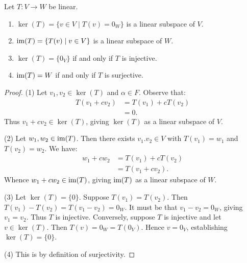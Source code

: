     \begin{proposition}
        Let $T:V \rightarrow W$ be linear.
            \begin{enumerate}[label = (\arabic*),itemsep=1pt,topsep=3pt]
                \item $\ker(T) = \{v \in V \mid T(v) = 0_W\}$ is a linear subspace of $V$.
                \item $\operatorname{im}(T) = \{T(v) \mid v \in V\}$ is a linear subspace of $W$.
                \item $\ker(T) = \{0_V\}$ if and only if $T$ is injective.
                \item $\operatorname{im}(T) = W$ if and only if $T$ is surjective.
            \end{enumerate}
    \end{proposition}
        \begin{proof}
            (1) Let $v_1,v_2 \in \ker(T)$ and $\alpha \in F$. Observe that:
                \begin{equation*}
                \begin{split}
                    T(v_1 + cv_2)
                    & = T(v_1) + cT(v_2) \\
                    & = 0.
                \end{split}
                \end{equation*}
            Thus $v_1 + cv_2 \in \ker(T)$, giving $\ker(T)$ as a linear subspace of $V$.

            (2) Let $w_1,w_2 \in \operatorname{im}(T)$. Then there exists $v_1.v_2 \in V$ with $T(v_1) = w_1$ and $T(v_2) = w_2$. We have:
                \begin{equation*}
                \begin{split}
                    w_1 + cw_2 
                    & = T(v_1) + cT(v_2) \\
                    & = T(v_1 + cv_2).
                \end{split}
                \end{equation*}
            Whence $w_1 + cw_2 \in \operatorname{im}(T)$, giving $\operatorname{im}(T)$ as a linear subspace of $W$.

            (3) Let $\ker(T) = \{0\}$. Suppose $T(v_1) = T(v_2)$. Then $T(v_1) - T(v_2) = T(v_1 - v_2) = 0_W$. It must be that $v_1 -v_2 = 0_W$, giving $v_1 = v_2$. Thus $T$ is injective. Conversely, suppose $T$ is injective and let $v \in \ker(T)$. Then $T(v) = 0_W = T(0_V)$. Hence $v = 0_V$, establishing $\ker(T) = \{0\}$.

            (4) This is by definition of surjectivity.
        \end{proof}

